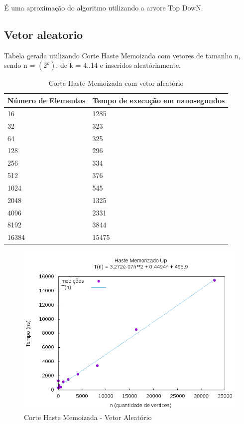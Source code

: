 \documentclass[12pt,a4paper,twoside]{report}
\begin{document}
É uma aproximação do algoritmo utilizando a arvore Top DowN.

\subsection{Vetor aleatorio}
Tabela gerada utilizando Corte Haste Memoizada com vetores de tamanho n, sendo n = $(2^k)$, de k = 4..14 e inseridos aleatóriamente.
\begin{table}[H]
\centering
\caption{Corte Haste Memoizada com vetor aleatório}
\label{my-label}
\begin{tabular}{|l|l|}
\hline
\multicolumn{1}{|c|}{\textbf{Número de Elementos}} & \multicolumn{1}{c|}{\textbf{Tempo de execução em nanosegundos}} \\ \hline
16 & 1285 \\ \hline
32 & 323 \\ \hline
64 & 325 \\ \hline
128 & 296 \\ \hline
256 & 334 \\ \hline
512 & 376 \\ \hline
1024 & 545 \\ \hline
2048 & 1325 \\ \hline
4096 & 2331 \\ \hline
8192 & 3844 \\ \hline
16384 & 15475 \\ \hline
\end{tabular}
\end{table}

\begin{figure}[H]
    \centering
    \includegraphics[width=0.7\linewidth]{graficos/CorteHasteMemorizado/Aleatorio/HasteMemo.png}
  \caption{Corte Haste Memoizada - Vetor Aleatório}
\end{figure}
\end{document}
